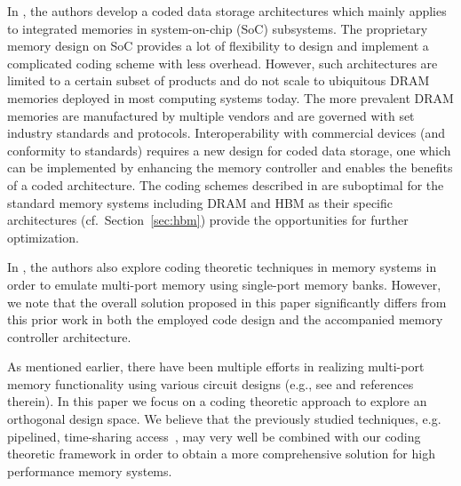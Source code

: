 In \cite{luan2017dynamic,luan2017intelligent,luan2017intelligent2}, the authors develop a coded data storage architectures which mainly applies to integrated memories in system-on-chip (SoC) subsystems. The proprietary memory design on SoC provides a lot of flexibility to design and implement a complicated coding scheme with less overhead. However, such architectures are limited to a certain subset of products and do not scale to ubiquitous DRAM memories deployed in most computing systems today. The more prevalent DRAM memories are manufactured by multiple vendors and are governed with set industry standards and protocols. Interoperability with commercial devices (and conformity to standards) requires a new design for coded data storage, one which can be implemented by enhancing the memory controller and enables the benefits of a coded architecture. The coding schemes described in \cite{luan2017dynamic,luan2017intelligent,luan2017intelligent2} are suboptimal for the standard memory systems including DRAM and HBM as their specific architectures (cf.~Section~\ref{sec:hbm}) provide the opportunities for further optimization.

In \cite{RG91, Memoir_xor, Memoir_xor_virtual}, the authors also explore coding theoretic techniques in memory systems in order to emulate multi-port memory using single-port memory banks. However, we note that the overall solution proposed in this paper significantly differs from this prior work in both the employed code design and the accompanied memory controller architecture. 

As mentioned earlier, there have been multiple efforts in realizing multi-port memory functionality using various circuit designs (e.g., see \cite{EMY91} and references therein). In this paper we focus on a coding theoretic approach to explore an orthogonal design space. We believe that the previously studied techniques, e.g. pipelined, time-sharing access~\cite{EMY91}, may very well be combined with our coding theoretic framework in order to obtain a more comprehensive solution for high performance memory systems.